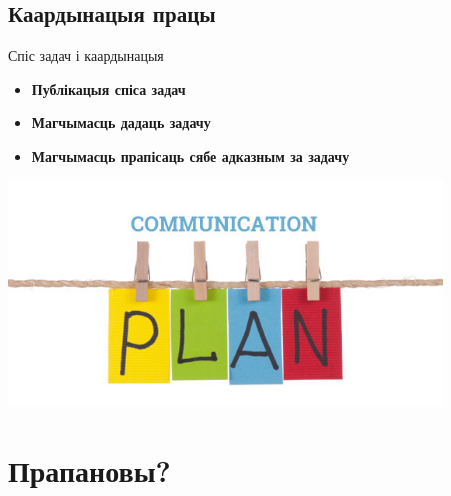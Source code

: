 \documentclass[ignorenonframetext,hyperref={pdftex,unicode}]{beamer}
\begin{document}
\subsection{Каардынацыя працы}
\begin{frame}{Спіс задач і каардынацыя}
	\begin{itemize}
		\item \textbf{Публікацыя спіса задач}
		\item \textbf{Магчымасць дадаць задачу}
		\item \textbf{Магчымасць прапісаць сябе адказным за задачу}
	\end{itemize}
	\begin{center}
		\includegraphics[height=170pt]{communication-plan}
	\end{center}
\end{frame}

\section{Прапановы?}
\end{document}
